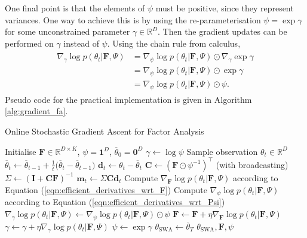 \documentclass[msc,deptreport.inf]{infthesis} %
\newcommand{\matr}[1]{\mathbf{#1}}
\newcommand{\R}{\mathbb R}
\begin{document}
One final point is that the elements of $\psi$ must be positive, since they represent variances. One way to achieve this is by using the re-parameterisation $\psi = \exp \gamma$ for some unconstrained parameter $\gamma \in \R^D$. Then the gradient updates can be performed on $\gamma$ instead of $\psi$. Using the chain rule from calculus, 
\begin{align}
\begin{split}\label{eqn:efficient_derivatives_wrt_gamma}
	\nabla_{\gamma} \log p(\theta_t | \matr{F}, \Psi)
	& = \nabla_{\psi} \log p(\theta_t | \matr{F}, \Psi) \odot \nabla_\gamma \exp \gamma \\
	& = \nabla_{\psi} \log p(\theta_t | \matr{F}, \Psi) \odot \exp \gamma \\
	& = \nabla_{\psi} \log p(\theta_t | \matr{F}, \Psi) \odot \psi.
\end{split}
\end{align} 
Pseudo code for the practical implementation is given in Algorithm \ref{alg:gradient_fa}.

\begin{algorithm}[!htbp] 
	\caption{Online Stochastic Gradient Ascent for Factor Analysis}
	\label{alg:gradient_fa}
	\begin{algorithmic}[1]
		\State Initialise $\matr{F} \in \R^{D \times K}$, $\psi = \matr{1}^D$, $\overline{\theta}_0 = \matr{0}^D$
		\State $\gamma \leftarrow \log \psi$
			\State Sample observation $\theta_t \in \R^D$
			\State
				$\overline{\theta}_t \leftarrow  \overline{\theta}_{t-1} + \frac{1}{t}\big(\overline{\theta}_t - \overline{\theta}_{t-1}\big)$
			\State $\matr{d}_t \leftarrow \theta_t - \overline{\theta}_t$
			\State $\matr{C} \leftarrow (\matr{F} \odot \psi^{-1})^\intercal$ (with broadcasting)
			\State $\Sigma \leftarrow (\matr{I} + \matr{C} \matr{F})^{-1}$ 
			\State $\matr{m}_t \leftarrow \Sigma \matr{C} \matr{d}_t$ 
			\State Compute $\nabla_{\matr{F}} \log p(\theta_t | \matr{F}, \Psi)$ 
			according to Equation (\ref{eqn:efficient_derivatives_wrt_F})
			\State Compute $\nabla_{\psi} \log p(\theta_t | \matr{F}, \Psi)$ 
			according to Equation (\ref{eqn:efficient_derivatives_wrt_Psi})
			\State $\nabla_{\gamma} \log p(\theta_t | \matr{F}, \Psi) \leftarrow \nabla_{\psi} \log p(\theta_t | \matr{F}, \Psi) \odot \psi$
			\State $\matr{F} \leftarrow \matr{F} + \eta \nabla_{\matr{F}} \log p(\theta_t | \matr{F}, \Psi)$
			\State $\gamma \leftarrow \gamma + \eta \nabla_{\gamma} \log p(\theta_t | \matr{F}, \Psi)$
			\State $\psi \leftarrow \exp \gamma$
		\EndFor
		\State $\theta_{\text{SWA}} \leftarrow \overline{\theta}_T$
		\State \Return $\theta_{\text{SWA}}, \matr{F}, \psi$
	\end{algorithmic}
\end{algorithm}
\end{document}

